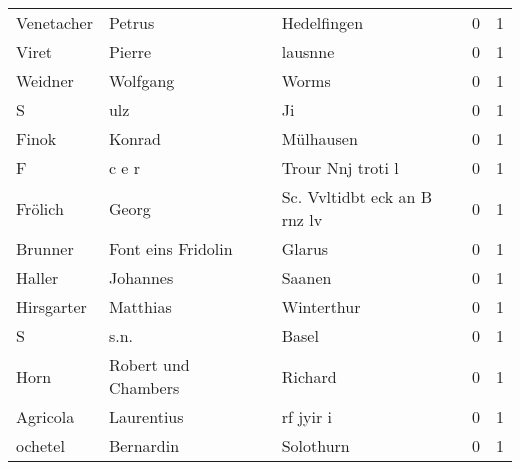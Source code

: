 \begin{tabular}{llllrr}
               Venetacher &                             Petrus &             &                                 Hedelfingen &          0 &         1 \\
                    Viret &                             Pierre &             &                                     lausnne &          0 &         1 \\
                  Weidner &                           Wolfgang &             &                                       Worms &          0 &         1 \\
                        S &                                ulz &             &                                          Ji &          0 &         1 \\
                    Finok &                             Konrad &             &                                   Mülhausen &          0 &         1 \\
                        F &                              c e r &             &                           Trour Nnj troti l &          0 &         1 \\
                  Frölich &                              Georg &             &                Sc. Vvltidbt eck an B rnz lv &          0 &         1 \\
                  Brunner &                 Font eins Fridolin &             &                                      Glarus &          0 &         1 \\
                   Haller &                           Johannes &             &                                      Saanen &          0 &         1 \\
               Hirsgarter &                           Matthias &             &                                  Winterthur &          0 &         1 \\
                        S &                               s.n. &             &                                       Basel &          0 &         1 \\
                     Horn &                Robert und Chambers &             &                                     Richard &          0 &         1 \\
                 Agricola &                         Laurentius &             &                                   rf jyir i &          0 &         1 \\
                  ochetel &                          Bernardin &             &                                   Solothurn &          0 &         1 \\

\end{tabular}
